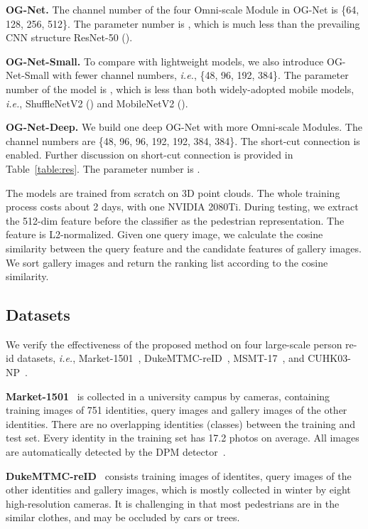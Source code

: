 \documentclass[journal]{IEEEtran}
\def\ie{\emph{i.e.}}
\begin{document}
\noindent\textbf{OG-Net.} The channel number of the four Omni-scale Module in OG-Net is \{64, 128, 256, 512\}. The parameter number is \textbf{}, which is much less than the prevailing CNN structure ResNet-50 (). 

\noindent\textbf{OG-Net-Small.} To compare with lightweight models, we also introduce OG-Net-Small with fewer channel numbers, \ie, \{48, 96, 192, 384\}. The parameter number of the model is \textbf{}, which is less than both widely-adopted mobile models, \ie, ShuffleNetV2 () and MobileNetV2 (). 

\noindent\textbf{OG-Net-Deep.} We build one deep OG-Net with more Omni-scale Modules. The channel numbers are \{48, 96, 96, 192, 192, 384, 384\}. The short-cut connection is enabled. Further discussion on short-cut connection is provided in Table~\ref{table:res}.  The parameter number is . 

The models are trained from scratch on 3D point clouds. The whole training process costs about 2 days, with one NVIDIA 2080Ti. During testing, we extract the 512-dim feature before the classifier as the pedestrian representation. The feature is L2-normalized. Given one query image, we calculate the cosine similarity between the query feature and the candidate features of gallery images. We sort gallery images and return the ranking list according to the cosine similarity. 

\subsection{Datasets} 
We verify the effectiveness of the proposed method on four large-scale person re-id datasets, \ie, Market-1501~\cite{zheng2015scalable}, DukeMTMC-reID~\cite{ristani2016performance,zheng2017unlabeled},  MSMT-17~\cite{wei2018person}, and CUHK03-NP~\cite{li2014deepreid,zhong2017re}. 

\noindent\textbf{Market-1501}~\cite{zheng2015scalable} is collected in a university campus by  cameras, containing  training images of 751 identities,  query images and  gallery images of the other  identities. There are no overlapping identities (classes) between the training and test set. Every identity in the training set
has 17.2 photos on average. All images are automatically detected by the DPM detector~\cite{felzenszwalb2009object}.

\noindent\textbf{DukeMTMC-reID}~\cite{ristani2016performance,zheng2017unlabeled} consists  training images of  identites,  query images of the other  identities and  gallery images, which is mostly collected in winter by eight high-resolution cameras. It is challenging in that most pedestrians are in the similar clothes, and may be occluded by cars or trees.
\end{document}
